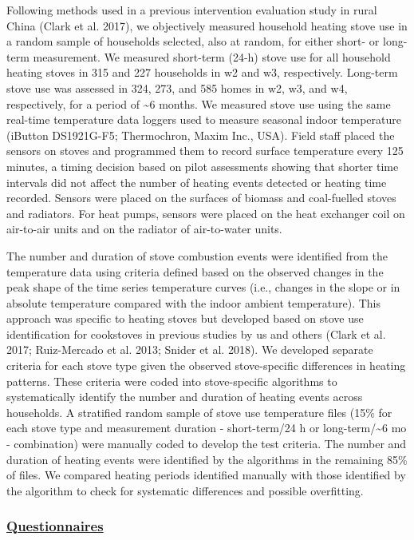 \documentclass[
  letterpaper,
  DIV=11,
  numbers=noendperiod]{scrartcl}
\providecommand{\DIFadd}[1]{{\protect\color{blue}\underline{#1}}} %
\providecommand{\DIFaddbegin}{} %
\providecommand{\DIFaddend}{} %
\providecommand{\DIFdelbegin}{} %
\providecommand{\DIFdelend}{} %
\newcommand{\DIFscaledelfig}{0.5}
\newlength{\DIFdelgraphicswidth} %
\newlength{\DIFdelgraphicsheight} %
\newcommand{\DIFaddincludegraphics}[2][]{{\color{blue}\fbox{\DIFOincludegraphics[#1]{#2}}}} %
\newcommand{\DIFdelincludegraphics}[2][]{%
\sbox{\DIFdelgraphicsbox}{\DIFOincludegraphics[#1]{#2}}%
\settoboxwidth{\DIFdelgraphicswidth}{\DIFdelgraphicsbox} %
\settoboxtotalheight{\DIFdelgraphicsheight}{\DIFdelgraphicsbox} %
\scalebox{\DIFscaledelfig}{%
\parbox[b]{\DIFdelgraphicswidth}{\usebox{\DIFdelgraphicsbox}\\[-\baselineskip] \rule{\DIFdelgraphicswidth}{0em}}\llap{\resizebox{\DIFdelgraphicswidth}{\DIFdelgraphicsheight}{%
\setlength{\unitlength}{\DIFdelgraphicswidth}%
\begin{picture}(1,1)%
\thicklines\linethickness{2pt} %
{\color[rgb]{1,0,0}\put(0,0){\framebox(1,1){}}}%
{\color[rgb]{1,0,0}\put(0,0){\line( 1,1){1}}}%
{\color[rgb]{1,0,0}\put(0,1){\line(1,-1){1}}}%
\end{picture}%
}\hspace*{3pt}}} %
} %
\DeclareRobustCommand{\DIFaddbegin}{\DIFOaddbegin \let\includegraphics\DIFaddincludegraphics} %
\DeclareRobustCommand{\DIFaddend}{\DIFOaddend \let\includegraphics\DIFOincludegraphics} %
\DeclareRobustCommand{\DIFdelbegin}{\DIFOdelbegin \let\includegraphics\DIFdelincludegraphics} %
\DeclareRobustCommand{\DIFdelend}{\DIFOaddend \let\includegraphics\DIFOincludegraphics} %
\begin{document}
Following methods used in a previous intervention evaluation study in
rural China (Clark et al. 2017), we objectively measured household
heating stove use in a random sample of households selected, also at
random, for either short- or long-term measurement. We measured
short-term (24-h) stove use for all household heating stoves in 315 and
227 households in w2 and w3, respectively. Long-term stove use was
assessed in 324, 273, and 585 homes in w2, w3, and w4, respectively, for
a period of \textasciitilde6 months. We measured stove use using the
same real-time temperature data loggers used to measure seasonal indoor
temperature (iButton DS1921G-F5; Thermochron, Maxim Inc., USA). Field
staff placed the sensors on stoves and programmed them to record surface
temperature every 125 minutes, a timing decision based on pilot
assessments showing that shorter time intervals did not affect the
number of heating events detected or heating time recorded. Sensors were
placed on the surfaces of biomass and coal-fuelled stoves and radiators.
For heat pumps, sensors were placed on the heat exchanger coil on
air-to-air units and on the radiator of air-to-water units.

The number and duration of stove combustion events were identified from
the temperature data using criteria defined based on the observed
changes in the peak shape of the time series temperature curves (i.e.,
changes in the slope or in absolute temperature compared with the indoor
ambient temperature). This approach was specific to heating stoves but
developed based on stove use identification for cookstoves in previous
studies by us and others (Clark et al. 2017; Ruiz-Mercado et al. 2013;
Snider et al. 2018). We developed separate criteria for each stove type
given the observed stove-specific differences in heating patterns. These
criteria were coded into stove-specific algorithms to systematically
identify the number and duration of heating events across households. A
stratified random sample of stove use temperature files (15\% for each
stove type and measurement duration - short-term/24 h or
long-term/\textasciitilde6 mo - combination) were manually coded to
develop the test criteria. The number and duration of heating events
were identified by the algorithms in the remaining 85\% of files. We
compared heating periods identified manually with those identified by
the algorithm to check for systematic differences and possible
overfitting.

\DIFdelbegin %
\DIFdelend \DIFaddbegin \subsubsection{\DIFadd{Questionnaires}}\label{questionnaires}
\DIFaddend 
\end{document}
